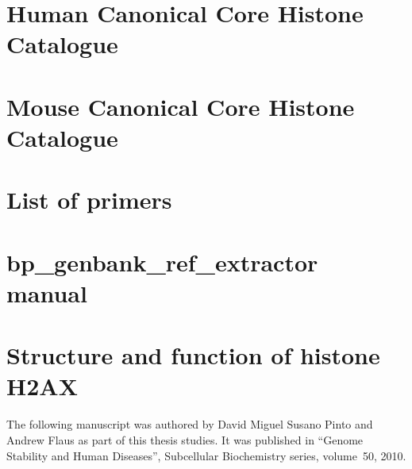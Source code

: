 \appendix

\chapter{Human Canonical Core Histone Catalogue}
  \begingroup
  \newcommand{\ResultsDir}{results-homo-sapiens}
  \newcommand{\FigsDir}{figs-homo-sapiens}
  \newcommand{\ReferenceDir}{data/reference-homo-sapiens}
  \endgroup

\chapter{Mouse Canonical Core Histone Catalogue}
  \label{ch:mouse-catalogue}
  \begingroup
  \newcommand{\ResultsDir}{results-mus-musculus}
  \newcommand{\FigsDir}{figs-mus-musculus}
  \newcommand{\ReferenceDir}{data/reference-mus-musculus/}
  \endgroup

\chapter{List of primers}
  \label{app:primers}

\chapter{bp\_genbank\_ref\_extractor manual}
  \label{app:pod-doc}
  

\chapter{Structure and function of histone H2AX}
  \label{app:h2ax-review}

  The following manuscript was authored by David Miguel Susano Pinto and
  Andrew Flaus as part of this thesis studies. It was published in ``Genome
  Stability and Human Diseases'', Subcellular Biochemistry series, volume~50,
  2010.

  
